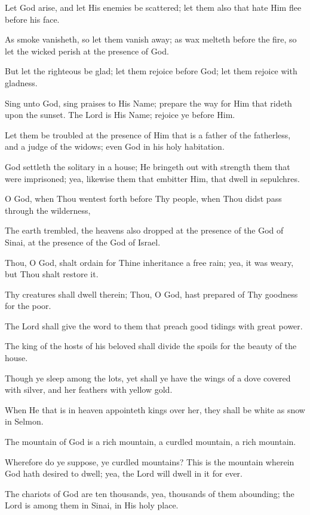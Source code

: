 Let God arise, and let His enemies be scattered; let them also that hate Him flee before his face.

As smoke vanisheth, so let them vanish away; as wax melteth before the fire, so let the wicked perish at the presence of God.

But let the righteous be glad; let them rejoice before God; let them rejoice with gladness.

Sing unto God, sing praises to His Name; prepare the way for Him that rideth upon the sunset. The Lord is His Name; rejoice ye before Him.

Let them be troubled at the presence of Him that is a father of the fatherless, and a judge of the widows; even God in his holy habitation.

God settleth the solitary in a house; He bringeth out with strength them that were imprisoned; yea, likewise them that embitter Him, that dwell in sepulchres.

O God, when Thou wentest forth before Thy people, when Thou didst pass through the wilderness,

The earth trembled, the heavens also dropped at the presence of the God of Sinai, at the presence of the God of Israel.

Thou, O God, shalt ordain for Thine inheritance a free rain; yea, it was weary, but Thou shalt restore it.

Thy creatures shall dwell therein; Thou, O God, hast prepared of Thy goodness for the poor.

The Lord shall give the word to them that preach good tidings with great power.

The king of the hosts of his beloved shall divide the spoils for the beauty of the house.

Though ye sleep among the lots, yet shall ye have the wings of a dove covered with silver, and her feathers with yellow gold.

When He that is in heaven appointeth kings over her, they shall be white as snow in Selmon.

The mountain of God is a rich mountain, a curdled mountain, a rich mountain.

Wherefore do ye suppose, ye curdled mountains? This is the mountain wherein God hath desired to dwell; yea, the Lord will dwell in it for ever.

The chariots of God are ten thousands, yea, thousands of them abounding; the Lord is among them in Sinai, in His holy place.

